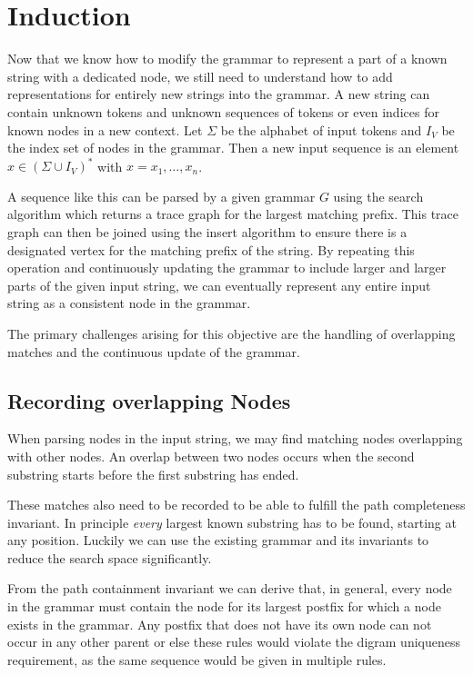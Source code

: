 \section{Induction}\label{sec:induction}
Now that we know how to modify the grammar to represent a part of a known string with a dedicated node, we still need to understand how to add representations for entirely new strings into the grammar. A new string can contain unknown tokens and unknown sequences of tokens or even indices for known nodes in a new context. Let $\Sigma$ be the alphabet of input tokens and $I_V$ be the index set of nodes in the grammar. Then a new input sequence is an element $x \in (\Sigma \cup I_V)^*$ with $x = x_1, \ldots, x_n$.

A sequence like this can be parsed by a given grammar $G$ using the search algorithm which returns a trace graph for the largest matching prefix. This trace graph can then be joined using the insert algorithm to ensure there is a designated vertex for the matching prefix of the string. By repeating this operation and continuously updating the grammar to include larger and larger parts of the given input string, we can eventually represent any entire input string as a consistent node in the grammar.

The primary challenges arising for this objective are the handling of overlapping matches and the continuous update of the grammar.

\subsection{Recording overlapping Nodes}

When parsing nodes in the input string, we may find matching nodes overlapping with other nodes. An overlap between two nodes occurs when the second substring starts before the first substring has ended.

These matches also need to be recorded to be able to fulfill the path completeness invariant. In principle \textit{every} largest known substring has to be found, starting at any position. Luckily we can use the existing grammar and its invariants to reduce the search space significantly.

From the path containment invariant we can derive that, in general, every node in the grammar must contain the node for its largest postfix for which a node exists in the grammar. Any postfix that does not have its own node can not occur in any other parent or else these rules would violate the digram uniqueness requirement, as the same sequence would be given in multiple rules. 

